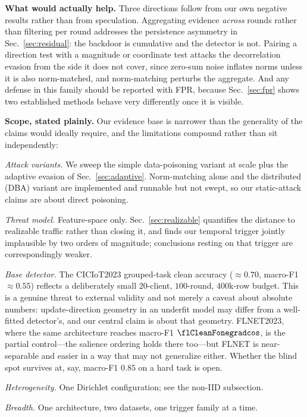 \textbf{What would actually help.} Three directions follow from our own negative
results rather than from speculation. Aggregating evidence \emph{across} rounds
rather than filtering per round addresses the persistence asymmetry in
Sec.~\ref{sec:residual}: the backdoor is cumulative and the detector is not.
Pairing a direction test with a magnitude or coordinate test attacks the
decorrelation evasion from the side it does not cover, since zero-sum noise
inflates norms unless it is also norm-matched, and norm-matching perturbs the
aggregate. And any defense in this family should be reported with FPR, because
Sec.~\ref{sec:fpr} shows two established methods behave very differently once it
is visible.

\textbf{Scope, stated plainly.} Our evidence base is narrower than the generality
of the claims would ideally require, and the limitations compound rather than
sit independently:

\emph{Attack variants.} We sweep the simple data-poisoning variant at scale plus
the adaptive evasion of Sec.~\ref{sec:adaptive}. Norm-matching alone and the
distributed (DBA) variant are implemented and runnable but not swept, so our
static-attack claims are about direct poisoning.

\emph{Threat model.} Feature-space only. Sec.~\ref{sec:realizable} quantifies the
distance to realizable traffic rather than closing it, and finds our temporal
trigger jointly implausible by two orders of magnitude; conclusions resting on
that trigger are correspondingly weaker.

\emph{Base detector.} The CICIoT2023 grouped-task clean accuracy
($\approx0.70$, macro-F1 $\approx0.55$) reflects a deliberately small
$20$-client, $100$-round, $400$k-row budget. This is a genuine threat to
external validity and not merely a caveat about absolute numbers: update-direction
geometry in an underfit model may differ from a well-fitted detector's, and our
central claim is about that geometry. FLNET2023, where the same architecture
reaches macro-F1 $\flCleanFonegradcos$, is the partial control---the salience ordering holds
there too---but FLNET is near-separable and easier in a way that may not
generalize either. Whether the blind spot survives at, say, macro-F1 $0.85$ on a
hard task is open.

\emph{Heterogeneity.} One Dirichlet configuration; see the non-IID subsection.

\emph{Breadth.} One architecture, two datasets, one trigger family at a time.

